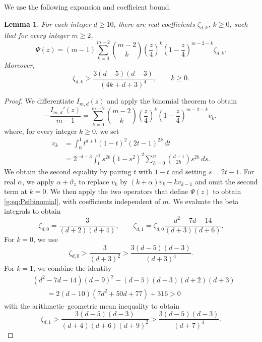 \documentclass[10pt,a4paper]{article}
\numberwithin{equation}{section}
\newtheorem{lemma}[theorem]{Lemma}
\theoremstyle{remark}\newtheorem{remark}[theorem]{Remark}
\begin{document}
We use the following expansion and coefficient bound.
\begin{lemma}\label{g:lem:coefflower}
For each integer $d\ge10$, there are real coefficients $\zeta_{d,k}$,
$k\ge0$, such that for every integer $m\ge2$,
\begin{equation}\label{g:eq:Psibinomial}
 \Psi(z)=(m-1)\sum_{k=0}^{m-2}\binom{m-2}{k}
 \left(\frac z4\right)^k\left(1-\frac z4\right)^{m-2-k}\zeta_{d,k}.
\end{equation}
Moreover,
\[
 \zeta_{d,k}>\frac{3(d-5)(d-3)}{(4k+d+3)^4},\qquad k\ge0.
\]
\end{lemma}
\begin{proof}
We differentiate $I_{m,d}(z)$ and apply the binomial theorem to obtain
\[
 -\frac{I_{m,d}'(z)}{m-1}
 =\sum_{k=0}^{m-2}\binom{m-2}{k}
 \left(\frac z4\right)^k\left(1-\frac z4\right)^{m-2-k}v_k,
\]
where, for every integer $k\ge0$, we set
\[
\begin{aligned}
 v_k&=\int_0^1t^{d+1}(1-t)^2(2t-1)^{2k}\,dt\\
 &=2^{-d-3}\int_0^1s^{2k}(1-s^2)^2
 \sum_{h=0}^{n}\binom{d-1}{2h}s^{2h}\,ds.
\end{aligned}
\]
We obtain the second equality by pairing $t$ with $1-t$ and setting $s=2t-1$.
For real $\alpha$, we apply $\alpha+\vartheta_z$ to replace $v_k$ by
$(k+\alpha)v_k-kv_{k-1}$ and omit the second term at $k=0$.
We then apply the two operators that define $\Psi(z)$ to obtain
\eqref{g:eq:Psibinomial}, with coefficients independent of $m$.
We evaluate the beta integrals to obtain
\[
 \zeta_{d,0}=\frac{3}{(d+2)(d+4)},\qquad
 \zeta_{d,1}=\zeta_{d,0}\frac{d^2-7d-14}{(d+3)(d+6)}.
\]
For $k=0$, we use
\[
 \zeta_{d,0}>\frac{3}{(d+3)^2}
 >\frac{3(d-5)(d-3)}{(d+3)^4}.
\] For $k=1$, we combine the identity
\[
\begin{aligned}
 &(d^2-7d-14)(d+9)^2-(d-5)(d-3)(d+2)(d+3)\\
 &\qquad=2(d-10)(7d^2+50d+77)+316>0
\end{aligned}
\]
with the arithmetic--geometric mean inequality to obtain
\[
 \zeta_{d,1}>
 \frac{3(d-5)(d-3)}{(d+4)(d+6)(d+9)^2}
 >\frac{3(d-5)(d-3)}{(d+7)^4}.
\]


\end{proof}
\end{document}
